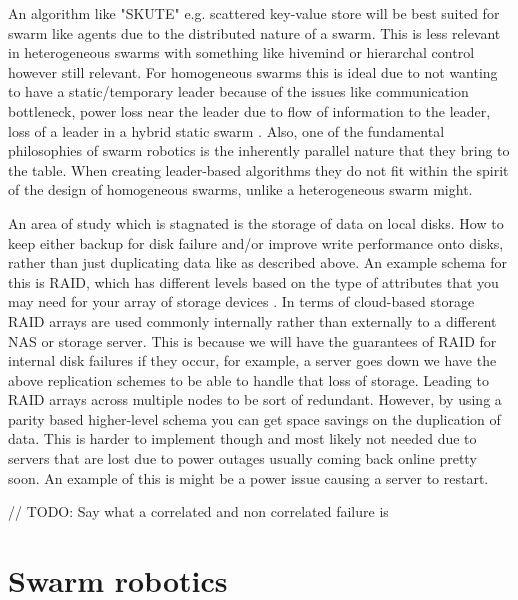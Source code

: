 \documentclass{UoYCSproject}
\begin{document}
An algorithm like "SKUTE" e.g. scattered key-value store \cite{Distributed Storage, Quorum} will be best suited for swarm like agents due to the distributed nature of a swarm.  
This is less relevant in heterogeneous swarms with something like hivemind or hierarchal control however still relevant. 
For homogeneous swarms this is ideal due to not wanting to have a static/temporary leader because of the issues like communication bottleneck, power loss near the leader due to flow of information to the leader, loss of a leader in a hybrid static swarm \cite{Swarm robotics reviewed, Swarm intellegiegence}.
Also, one of the fundamental philosophies of swarm robotics is the inherently parallel nature that they bring to the table. 
When creating leader-based algorithms they do not fit within the spirit of the design of homogeneous swarms, unlike a heterogeneous swarm might.

An area of study which is stagnated is the storage of data on local disks. How to keep either backup for disk failure and/or improve write performance onto disks, rather than just duplicating data like as described above.
An example schema for this is RAID, which has different levels based on the type of attributes that you may need for your array of storage devices \cite{RAID Levels}.
In terms of cloud-based storage RAID arrays are used commonly internally rather than externally to a different NAS or storage server.
This is because we will have the guarantees of RAID for internal disk failures if they occur, for example, a server goes down we have the above replication schemes to be able to handle that loss of storage.
Leading to RAID arrays across multiple nodes to be sort of redundant.
However, by using a parity \cite{Raid parity} based higher-level schema you can get space savings on the duplication of data. 
This is harder to implement though and most likely not needed due to servers that are lost due to power outages usually coming back online pretty soon.
 An example of this is might be a power issue causing a server to restart.

// TODO: Say what a correlated and non correlated failure is

\section{Swarm robotics}
\label{sec:Robotics}
\end{document}
